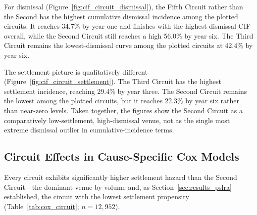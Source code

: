 For dismissal (Figure~\ref{fig:cif_circuit_dismissal}),
the Fifth Circuit rather than the Second has the highest
cumulative dismissal incidence among the plotted circuits.
It reaches 34.7\% by year one and finishes with the highest
dismissal CIF overall, while the Second Circuit still
reaches a high 56.0\% by year six. The Third Circuit remains
the lowest-dismissal curve among the plotted circuits at
42.4\% by year six.

The settlement picture is qualitatively different
(Figure~\ref{fig:cif_circuit_settlement}). The Third Circuit
has the highest settlement incidence, reaching 29.4\% by
year three. The Second Circuit remains the lowest among the
plotted circuits, but it reaches 22.3\% by year six rather
than near-zero levels. Taken together, the figures show the
Second Circuit as a comparatively low-settlement,
high-dismissal venue, not as the single most extreme
dismissal outlier in cumulative-incidence terms.

\subsection{Circuit Effects in Cause-Specific Cox Models}

Every circuit exhibits significantly higher settlement
hazard than the Second Circuit---the dominant venue by
volume and, as Section~\ref{sec:results_pslra} established,
the circuit with the lowest settlement propensity
(Table~\ref{tab:cox_circuit}; $n = 12{,}952$).

